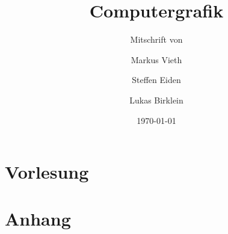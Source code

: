 \documentclass[a4paper,11pt,twoside,draft=false,open=any]{scrbook}
\title{Computergrafik}
\subtitle{Mitschrift von}
\author{Markus Vieth\and Steffen Eiden\and Lukas Birklein}
\date{\today}
\begin{document}
\maketitle
\cleardoublepage
\frontmatter

\cleardoublepage
\tableofcontents
\clearpage

\mainmatter
\part{Vorlesung}
%













%
%
%
%
%
%
%
%
%
%
%
%
%
%
\appendix
\part{Anhang}

\end{document}
